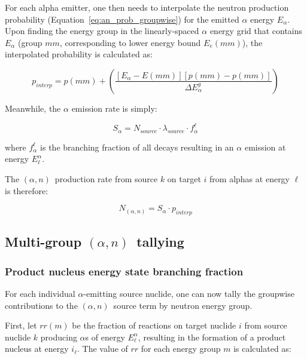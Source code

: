 \documentclass[10pt]{article}
\newcommand{\alphn}[0]{$\left(\alpha,n\right)$}
\begin{document}
For each alpha emitter, one then needs to interpolate the neutron production probability (Equation~\eqref{eq:an_prob_groupwise}) for the emitted $\alpha$ energy $E_\alpha$. Upon finding the energy group in the linearly-spaced $\alpha$ energy grid that contains $E_\alpha$ (group $mm$, corresponding to lower energy bound $E_e\left(mm\right)$), the interpolated probability is calculated as:

\begin{equation}
\boxed{ \displaystyle p_{interp} = p\left(mm\right) + \left( \frac{ \left[ E_\alpha - E\left(mm\right) \right] \left[ p\left(mm\right) - p\left(mm\right) \right]}{\Delta E_\alpha^g } \right) }
\label{eq:p_interp}
\end{equation}

Meanwhile, the $\alpha$ emission rate is simply: 

\begin{equation}
S_\alpha = N_{source} \cdot \lambda_{source} \cdot f_\alpha^\ell
\end{equation}

where $f_\alpha^\ell$ is the branching fraction of all decays resulting in an $\alpha$ emission at energy $E^\alpha_\ell$.

The \alphn\ production rate from source $k$ on target $i$ from alphas at energy $\ell$ is therefore:

\begin{equation}
N_{\left(\alpha,n\right)} = S_\alpha \cdot p_{interp}
\end{equation}

\subsection{Multi-group \alphn\ tallying}

\subsubsection{Product nucleus energy state branching fraction}

For each individual $\alpha$-emitting source nuclide, one can now tally the groupwise contributions to the \alphn\ source term by neutron energy group.

First, let $rr\left(m\right)$ be the fraction of reactions on target nuclide $i$ from source nuclide $k$ producing $\alpha$s of energy $E^\alpha_\ell$, resulting in the formation of a product nucleus at energy $i_\ell$. The value of $rr$ for each energy group $m$ is calculated as:
\end{document}
